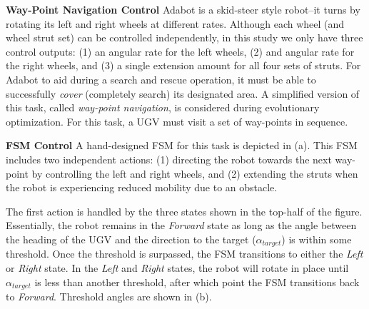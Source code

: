 \vspace{0.1in}
\noindent
\textbf{Way-Point Navigation Control}
%
Adabot is a skid-steer style robot--it turns by rotating its left and right wheels at different rates. Although each wheel (and wheel strut set) can be controlled independently, in this study we only have three control outputs: (1) an angular rate for the left wheels, (2) and angular rate for the right wheels, and (3) a single extension amount for all four sets of struts.
%
For Adabot to aid during a search and rescue operation, it must be able to successfully \emph{cover} (completely search) its designated area.
%
A simplified version of this task, called \emph{way-point navigation}, is considered during evolutionary optimization.
%
For this task, a UGV must visit a set of way-points in sequence.
%


\vspace{0.1in}
\noindent
\textbf{FSM Control}
A hand-designed FSM for this task is depicted in (a).
%
This FSM includes two independent actions: (1) directing the robot towards the next way-point by controlling the left and right wheels, and (2) extending the struts when the robot is experiencing reduced mobility due to an obstacle.



The first action is handled by the three states shown in the top-half of the figure. Essentially, the robot remains in the \emph{Forward} state as long as the angle between the heading of the UGV and the direction to the target ($\alpha_{\mathit{target}}$) is within some threshold.
%
Once the threshold is surpassed, the FSM transitions to either the \emph{Left} or \emph{Right} state.
%
In the \emph{Left} and \emph{Right} states, the robot will rotate in place until $\alpha_{\mathit{target}}$ is less than another threshold, after which point the FSM transitions back to \emph{Forward}.
%
Threshold angles are shown in (b).

